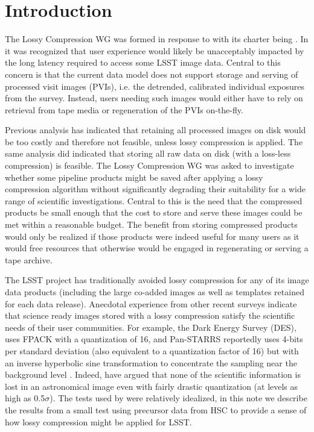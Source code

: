 
\section{Introduction}

The Lossy Compression WG was formed in response to  with its charter
being .  In  it was recognized that user 
experience would likely be unacceptably impacted by the long latency required to 
access some LSST image data.  Central to this concern is that the current data model 
does not support storage and serving of processed visit images (PVIs), i.e. the 
detrended, calibrated individual exposures from the survey.  Instead, users needing
such images would either have to rely on retrieval from tape media or regeneration
of the PVIs on-the-fly.

Previous analysis has indicated that retaining all processed images on disk would 
be too costly and therefore not feasible, unless lossy compression is applied. 
The same analysis did indicated that storing all raw data on disk (with a loss-less 
compression) is feasible.  The Lossy Compression WG was asked to investigate whether 
some pipeline products might be saved after applying a lossy compression algorithm 
without significantly degrading their suitability for a wide range of scientific 
investigations.  Central to this is the need that the compressed products be small 
enough that the cost to store and serve these images could be met within a reasonable 
budget.  The benefit from storing compressed products would only be realized if those 
products were indeed useful for many users as it would free resources that otherwise
would be engaged in regenerating or serving a tape archive.

The LSST project has traditionally avoided lossy compression for any of its image data products 
(including the large co-added images as well as templates retained for each data release). 
Anecdotal experience from other recent surveys indicate that science ready images stored
with a lossy compression satisfy the scientific needs of their user communities.  For example, 
the Dark Energy Survey (DES), uses FPACK \citep{PSW2009} with a quantization of 16, 
and Pan-STARRS reportedly uses 4-bits per standard deviation (also equivalent to a 
quantization factor of 16) but with an inverse hyperbolic sine transformation to concentrate 
the sampling near the background level \citep{Wetal2016}.  Indeed, \citet{PWH2010} have 
argued that none of the scientific information is lost in an astronomical image even with 
fairly drastic quantization (at levels as high as 0.5$\sigma$).  The tests used by \citet{PWH2010} 
were relatively idealized, in this note we describe the results from a small test using 
precursor data from HSC to provide a sense of how lossy compression might be applied for LSST.


